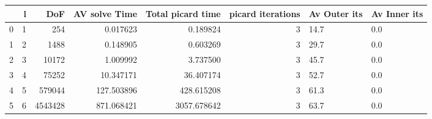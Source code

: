 \begin{tabular}{lrrrrrll}
\toprule
{} &  l &      DoF &  AV solve Time &  Total picard time &  picard iterations & Av Outer its & Av Inner its \\
\midrule
0 &  1 &      254 &       0.017623 &           0.189824 &                  3 &         14.7 &          0.0 \\
1 &  2 &     1488 &       0.148905 &           0.603269 &                  3 &         29.7 &          0.0 \\
2 &  3 &    10172 &       1.009992 &           3.737500 &                  3 &         45.7 &          0.0 \\
3 &  4 &    75252 &      10.347171 &          36.407174 &                  3 &         52.7 &          0.0 \\
4 &  5 &   579044 &     127.503896 &         428.615208 &                  3 &         61.3 &          0.0 \\
5 &  6 &  4543428 &     871.068421 &        3057.678642 &                  3 &         63.7 &          0.0 \\
\bottomrule
\end{tabular}
